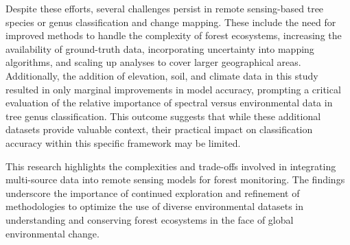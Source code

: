Despite these efforts, several challenges persist in remote sensing-based tree species or genus classification and change mapping. These include the need for improved methods to handle the complexity of forest ecosystems, increasing the availability of ground-truth data, incorporating uncertainty into mapping algorithms, and scaling up analyses to cover larger geographical areas. Additionally, the addition of elevation, soil, and climate data in this study resulted in only marginal improvements in model accuracy, prompting a critical evaluation of the relative importance of spectral versus environmental data in tree genus classification. This outcome suggests that while these additional datasets provide valuable context, their practical impact on classification accuracy within this specific framework may be limited.

This research highlights the complexities and trade-offs involved in integrating multi-source data into remote sensing models for forest monitoring. The findings underscore the importance of continued exploration and refinement of methodologies to optimize the use of diverse environmental datasets in understanding and conserving forest ecosystems in the face of global environmental change.
